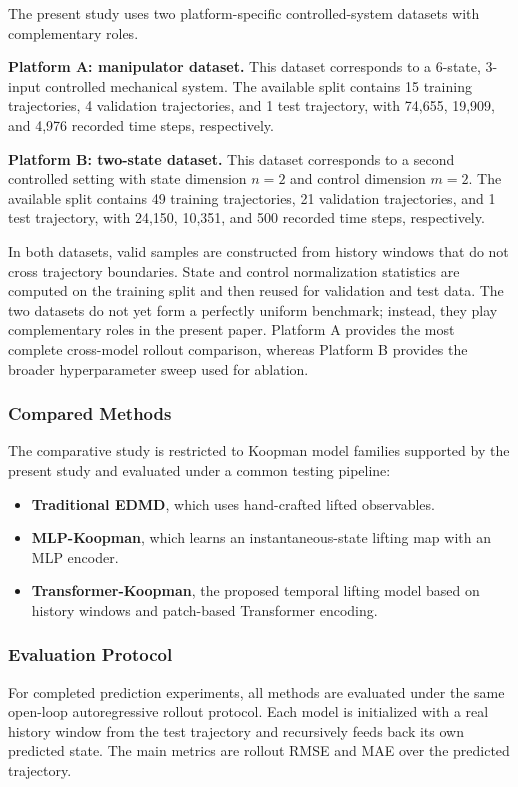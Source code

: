 \documentclass[journal]{IEEEtran}
\begin{document}
The present study uses two platform-specific controlled-system datasets with complementary roles.

\textbf{Platform A: manipulator dataset.} This dataset corresponds to a 6-state, 3-input controlled mechanical system. The available split contains 15 training trajectories, 4 validation trajectories, and 1 test trajectory, with 74,655, 19,909, and 4,976 recorded time steps, respectively.

\textbf{Platform B: two-state dataset.} This dataset corresponds to a second controlled setting with state dimension $n=2$ and control dimension $m=2$. The available split contains 49 training trajectories, 21 validation trajectories, and 1 test trajectory, with 24,150, 10,351, and 500 recorded time steps, respectively.

In both datasets, valid samples are constructed from history windows that do not cross trajectory boundaries. State and control normalization statistics are computed on the training split and then reused for validation and test data. The two datasets do not yet form a perfectly uniform benchmark; instead, they play complementary roles in the present paper. Platform A provides the most complete cross-model rollout comparison, whereas Platform B provides the broader hyperparameter sweep used for ablation.

\subsubsection{Compared Methods}

The comparative study is restricted to Koopman model families supported by the present study and evaluated under a common testing pipeline:
\begin{itemize}
    \item \textbf{Traditional EDMD}, which uses hand-crafted lifted observables.
    \item \textbf{MLP-Koopman}, which learns an instantaneous-state lifting map with an MLP encoder.
    \item \textbf{Transformer-Koopman}, the proposed temporal lifting model based on history windows and patch-based Transformer encoding.
\end{itemize}

\subsubsection{Evaluation Protocol}

For completed prediction experiments, all methods are evaluated under the same open-loop autoregressive rollout protocol. Each model is initialized with a real history window from the test trajectory and recursively feeds back its own predicted state. The main metrics are rollout RMSE and MAE over the predicted trajectory.
\end{document}
